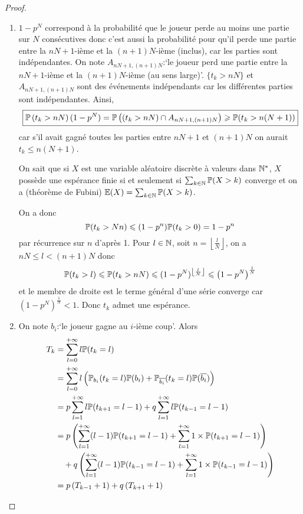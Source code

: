 \begin{proof}
    \phantom{}
    \begin{enumerate}
        \item $1-p^{N}$ correspond à la probabilité que le joueur perde au moins une partie sur $N$ consécutives donc c'est aussi la probabilité pour qu'il perde une partie entre la $nN+1$-ième et la $(n+1)N$-ième (inclus), car les parties sont indépendantes. On note $A_{nN+1,(n+1)N}$:`le joueur perd une partie entre la $nN+1$-ième et la $(n+1)N$-ième (au sens large)'. $\lbrace t_{k}>nN\rbrace$ et $A_{nN+1,(n+1)N}$ sont des événements indépendants car les différentes parties sont indépendantes. Ainsi,
        \begin{equation}
            \boxed{\P\left(t_{k}>nN\right)(1-p^{N})=\P\left(\left(t_{k}>nN\right)\cap A_{nN+1,(n+1)N}\right)\geqslant\P(t_{k}>n(N+1))}
        \end{equation}
        car s'il avait gagné toutes les parties entre $nN+1$ et $(n+1)N$ on aurait $t_{k}\leqslant n(N+1)$.

        On sait que si $X$ est une variable aléatoire discrète à valeurs dans $\N^{*}$, $X$ possède une espérance finie si et seulement si $\sum_{k\in\N}\P(X>k)$ converge et on a (théorème de Fubini) $\E(X)=\sum_{k\in\N}\P(X>k)$.

        On a donc 
        \begin{equation}
            \P(t_{k}>Nn)\leqslant (1-p^{n})\P(t_{k}>0)=1-p^{n}
        \end{equation}
        par récurrence sur $n$ d'après 1. Pour $l\in\N$, soit $n=\left\lfloor\frac{l}{N}\right\rfloor$, on a $nN\leqslant l<(n+1)N$ donc 
        \begin{equation}
            \P(t_{k}>l)\leqslant\P(t_{k}>nN)\leqslant(1-p^{N})^{\left\lfloor\frac{l}{N}\right\rfloor}\leqslant\left(1-p^{N}\right)^{\frac{l}{N}}
        \end{equation}
        et le membre de droite est le terme général d'une série converge car $\left(1-p^{N}\right)^{\frac{1}{N}}<1$. Donc $t_{k}$ admet une espérance.

        \item On note $b_{i}$:`le joueur gagne au $i$-ième coup'. Alors 
        \begin{align}
            T_{k}
            &=\sum_{l=0}^{+\infty}l\P(t_{k}=l)\\
            &=\sum_{l=0}^{+\infty}l\left(\P_{b_{i}}(t_{k}=l)\P(b_{i})+\P_{\overline{b_{i}}}(t_{k}=l)\P(\overline{b_{i}})\right)\\
            &=p\sum_{l=1}^{+\infty}l\P(t_{k+1}=l-1)+q\sum_{l=1}^{+\infty}l\P(t_{k-1}=l-1)\\
            &=p\left(\sum_{l=1}^{+\infty}(l-1)\P(t_{k+1}=l-1)+\sum_{l=1}^{+\infty}1\times\P(t_{k+1}=l-1)\right)\notag\\
            &~~~+q\left(\sum_{l=1}^{+\infty}(l-1)\P(t_{k-1}=l-1)+\sum_{l=1}^{+\infty}1\times\P(t_{k-1}=l-1)\right)\\
            &=p\left(T_{k-1}+1\right)+q\left(T_{k+1}+1\right)
        \end{align}


\end{enumerate}
\end{proof}

